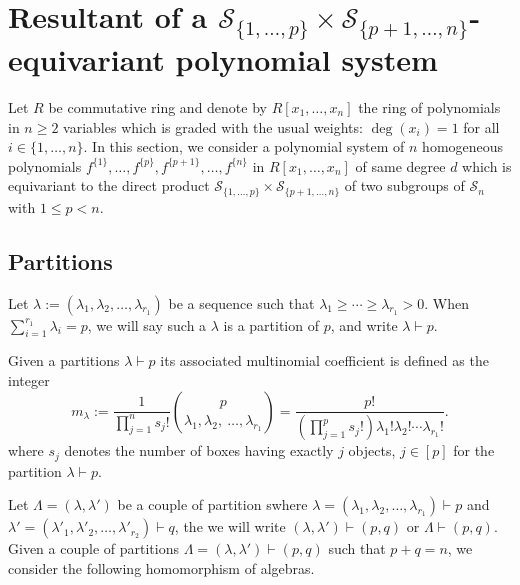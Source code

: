 \documentclass[12pt,a4paper,reqno]{amsart}
\theoremstyle{definition}
\theoremstyle{remark}
\numberwithin{equation}{section}
\begin{document}
\section{Resultant of a $\mathcal{S}_{\{1,\ldots,p\}}\times \mathcal{S}_{\{p+1,\ldots,n\}}$-equivariant polynomial system}\label{sec:resultant}
Let $R$ be commutative ring and denote by $R[x_1,\ldots,x_n]$ the ring of polynomials in $n \geq 2$ variables which is graded with the usual weights: $\deg (x_i)=1$ for all $i \in \{ 1,\ldots,n\}.$
In this section, we consider a polynomial system of $n$ homogeneous polynomials $f^{\{1\}},\ldots, f^{\{p\}}, f^{\{p+1\}},\ldots, f^{\{n\}}$ in $R[x_1,\ldots,x_n]$ of same degree $d$ which is equivariant to the direct product $\mathcal{S}_{\{1
,\ldots,p\}}\times\mathcal{S}_{\{p+1
,\ldots,n\}} $ of two subgroups of  $\mathcal{S}_{n}$ with $1\leq p< n$.

\subsection{Partitions}

Let $\lambda:=(\lambda_1,\lambda_2,\ldots,\lambda_{r_1})$ be a sequence such that $\lambda_1\geq \cdots \geq \lambda_{r_1} > 0$. When $\sum_{i=1}^{r_1}\lambda_i=p$, we will say such a $\lambda$ is a partition of $p$, and write $\lambda\vdash p.$

Given a partitions $\lambda  \vdash p$ its associated multinomial coefficient is defined as the integer
\begin{equation}\label{eq:mlambda}
m_{\lambda}:=\frac{1}{\prod_{j=1}^{n}s_{j}!} {{p}\choose{\lambda_1, \lambda_2,\ \ldots , \lambda_{r_1}}}= \frac{ p!}{(\prod_{j=1}^{p}s_{j}!) \lambda_1 !\lambda_2! \cdots \lambda_{r_1}!} .
\end{equation}
where $s_j$ denotes the number of boxes having exactly $j$ objects,   $j\in [p]$ for the partition $\lambda \vdash p.$

Let $\Lambda=(\lambda,\lambda')$ be a couple of partition swhere $\lambda=(\lambda_1,\lambda_2,\ldots,\lambda_{r_1}) \vdash p$ and $\lambda'=(\lambda'_1,\lambda'_2,\ldots,\lambda'_{r_2}) \vdash q$, the  we will write  $(\lambda,\lambda')\vdash (p,q)$ or $ \Lambda \vdash (p,q)$.
Given a couple of partitions $\Lambda=(\lambda,\lambda')\vdash (p,q)$ such that $p+q=n$, we consider the following homomorphism of algebras.
\end{document}
